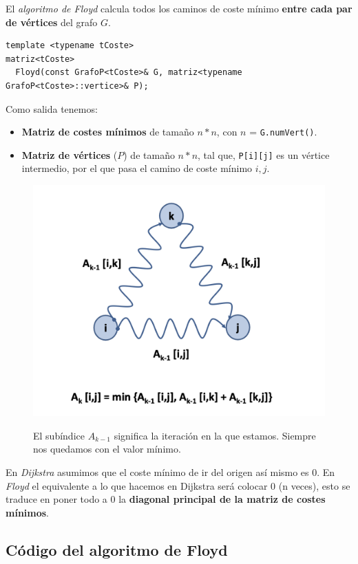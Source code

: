 El \textit{algoritmo de Floyd} calcula todos los caminos de coste mínimo \textbf{entre cada par de vértices} del grafo \(G\).
\begin{verbatim}
template <typename tCoste> 
matriz<tCoste>
  Floyd(const GrafoP<tCoste>& G, matriz<typename GrafoP<tCoste>::vertice>& P);
\end{verbatim}

Como salida tenemos:
\begin{itemize}
  \item \textbf{Matriz de costes mínimos} de tamaño \(n*n\), con \(n\) = \texttt{G.numVert()}.
  \item \textbf{Matriz de vértices} (\(P\)) de tamaño \(n*n\), tal que, \texttt{P[i][j]} es un vértice intermedio, por el que pasa el camino de coste mínimo \(i, j\).
\end{itemize}

\begin{figure}[h]
  \begin{center}
    \includegraphics[width=.5\textwidth]{assets/flo1.png}
  \end{center}
El subíndice \(A_{k-1}\) significa la iteración en la que estamos. Siempre nos quedamos con el valor mínimo.
\end{figure}

En \textit{Dijkstra} asumimos que el coste mínimo de ir del origen así mismo es 0. En \textit{Floyd} el equivalente a lo que hacemos en Dijkstra será colocar 0 (n veces), esto se traduce en poner todo a 0 la \textbf{diagonal principal de la matriz de costes mínimos}.

\subsection{Código del algoritmo de Floyd}

